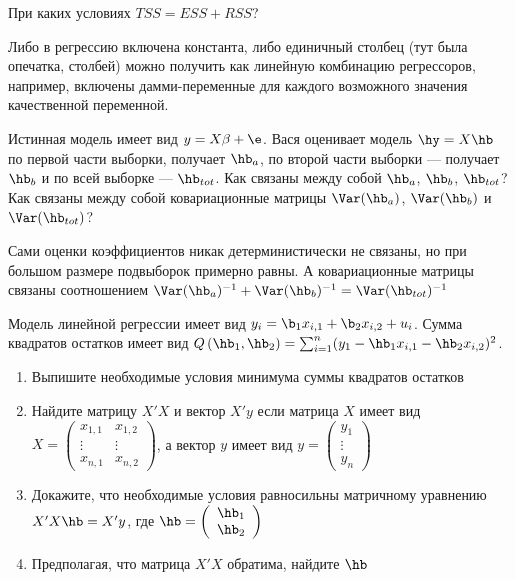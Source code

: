 \documentclass[pdftex,11pt,openany]{book}\usepackage[]{graphicx}\usepackage[]{color}
\begin{document}
\begin{problem}
При каких условиях $TSS=ESS+RSS$?
\end{problem}
\begin{solution}
Либо в регрессию включена константа, либо единичный столбец (тут была опечатка, столбей) можно получить как линейную комбинацию регрессоров, например, включены дамми-переменные для каждого возможного значения качественной переменной.
\end{solution}




\begin{problem}
Истинная модель имеет вид $y=X\beta +\e$. Вася оценивает модель $\hy=X \hb$ по первой части выборки, получает $\hb_a$, по второй части выборки --- получает $\hb_b$ и по всей выборке --- $\hb_{tot}$. Как связаны между собой $\hb_a$, $\hb_b$, $\hb_{tot}$? Как связаны между собой ковариационные матрицы $\Var(\hb_a)$,  $\Var(\hb_b)$ и  $\Var(\hb_{tot})$?
\end{problem}

\begin{solution}
Сами оценки коэффициентов никак детерминистически не связаны, но при большом размере подвыборок примерно равны. А ковариационные матрицы связаны соотношением $\Var(\hb_a)^{-1}+\Var(\hb_b)^{-1}=\Var(\hb_{tot})^{-1}$ 
\end{solution}




\begin{problem}
Модель линейной регрессии имеет вид $y_i=\b_1 x_{i,1}+\b_2 x_{i,2} + u_i$.
Сумма квадратов остатков имеет вид $Q\left(\hb_1,\hb_2\right)=\sum_{i=1}^n (y_1-\hb_1 x_{i,1}-\hb_2 x_{i,2})^2$.
\begin{enumerate}
\item Выпишите необходимые условия минимума суммы квадратов остатков
\item Найдите матрицу $X'X$ и вектор $X'y$ если матрица $X$ имеет вид
$X=
\left(
\begin{array}{cc}
x_{1,1} & x_{1,2} \\
\vdots & \vdots \\
x_{n,1} & x_{n,2}
\end{array}
\right)
$,
а вектор $y$ имеет вид
$y=
\left(
\begin{array}{c}
y_1 \\
\vdots \\
y_n
\end{array}
\right)
$
\item Докажите, что необходимые условия равносильны матричному уравнению $X'X\hb=X'y$, где
$\hb=
\left(
\begin{array}{c}
\hb_1 \\
\hb_2
\end{array}
\right)
$
\item Предполагая, что матрица $X'X$ обратима, найдите $\hb$
\end{enumerate}
\end{problem}
\begin{solution}
\end{solution}
\end{document}
